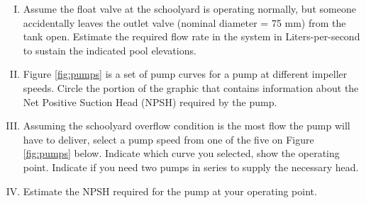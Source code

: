 \documentclass[11pt]{article}
\begin{document}
\begin{enumerate}
\begin{enumerate}[(I)]
~\\~\\~\\~\\~\\~\\~\\~\\~\\~\\~\\~\\~\\~\\~\\~\\~\\~\\~\\~\\~\\~\\~\\~\\
\item Assume the float valve at the schoolyard is operating normally, but someone accidentally leaves the outlet valve (nominal diameter = 75 mm) from the tank open.  Estimate the required flow rate in the system in Liters-per-second to sustain the indicated pool elevations.
\clearpage
\item Figure \ref{fig:pumps} is a set of pump curves for a pump at different impeller speeds.  Circle the portion of the graphic that contains information about the Net Positive Suction Head (NPSH) required by the pump.
\item Assuming the schoolyard overflow condition is the most flow the pump will have to deliver, select a pump speed from one of the five on Figure \ref{fig:pumps} below.  Indicate which curve you selected, show the operating point.  Indicate if you need two pumps in series to supply the necessary head.
\item Estimate the NPSH required for the pump at your operating point.


\end{enumerate}
\end{enumerate}
\end{document}
